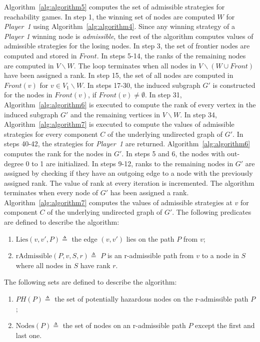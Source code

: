 Algorithm~\ref{alg:algorithm5} computes the set of
admissible strategies for reachability games. In step 1,
the winning set of nodes are computed $W$ for \textit{Player~1} using
Algorithm~\ref{alg:algorithm4}. Since any winning strategy of a
\textit{Player 1} winning node is \textit{admissible}, the rest of the
algorithm computes values of admissible strategies for the losing
nodes. In step 3, the set of frontier nodes are computed and stored
in $\mathit{Front}$. In steps 5-14, the ranks of the remaining nodes are computed
in $V \backslash W$. The loop terminates when all nodes in $V
\backslash(W \cup \mathit{Front})$ have been assigned a rank. In step 15, the set of all nodes are computed in $\mathit{Front}(v)$ for $v \in V_{1} \backslash
W$. In steps 17-30, the induced subgraph $G'$ is constructed for the
nodes in $\mathit{Front}(v)$, if $\mathit{Front}(v) \neq \emptyset$. In step 31, Algorithm~\ref{alg:algorithm6} is executed to compute the rank of
every vertex in the induced subgraph $G'$ and the remaining vertices
in $V \backslash W$. In step 34,
Algorithm~\ref{alg:algorithm7} is executed to compute the values of
admissible strategies for every component $C$ of the underlying
undirected graph of $G'$. In steps 40-42, the strategies for
\textit{Player~1} are returned.
\newline
\newline
Algorithm~\ref{alg:algorithm6} computes the rank for the nodes in $G'$. In steps 5 and 6, the nodes with out-degree 0 to 1 are initialized. In steps 9-12, ranks to the remaining nodes in $G'$ are assigned by checking if they have an outgoing edge to a node with the previously assigned rank. The value of rank at every iteration is incremented. The algorithm terminates when every node of $G'$ has been assigned a rank. 
\newline
\newline
Algorithm~\ref{alg:algorithm7} computes the values of admissible strategies at $v$ for component $C$  of the underlying undirected graph of $G'$. The following predicates are defined to describe the algorithm:
\begin{enumerate}
	\item $\mathrm{Lies}(v,v',P) \triangleq $ the edge $(v,v')$ lies on the path $P$ from $v$;
	\item $\mathrm{rAdmissible}(P,v,S,r) \triangleq $ $P$ is an r-admissible path from $v$ to a node in $S$ where all nodes in $S$ have rank $r$.
\end{enumerate}
The following sets are defined to describe the algorithm:
\begin{enumerate}
	\item $\mathrm{\mathit{PH}}(P) \triangleq $ the set of potentially hazardous nodes on the r-admissible path $P$;
	\item $\mathrm{Nodes}(P) \triangleq $ the set of nodes on an r-admissible path $P$ except the first and last one.
\end{enumerate}

